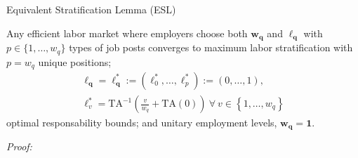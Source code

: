 \documentclass[hidelinks, nonatbib]{elsarticle}
\begin{document}
% 

Equivalent Stratification Lemma (ESL)

Any efficient labor market where employers choose both $\boldsymbol{w_q}$ and $\boldsymbol{\ell_q}$ with $p \in \{1, \dots, w_q\}$ types of job posts converges to maximum labor stratification with
$
p = w_q
$
unique positions;
\begin{gather}
\boldsymbol{\ell_q} = 
\boldsymbol{\ell_{q}^{*}}
:=
(
    \ell_{0}^{*}
    ,
    \dots
    ,
    \ell_{p}^{*}
)
:=
(
    0
    ,
    \dots
    ,
    1
)
,
\\
\ell_{v}^{*}
=
\text{TA}^{-1}\left(
    \frac{v}{w_q}
    +
    \text{TA}(0)
\right)
\
\forall
\
v \in 
\left\{
    1, \dots, w_q
\right\}
\end{gather}
optimal responsability bounds; and unitary employment levels,
$
\boldsymbol{w_q} =
\boldsymbol{1}
.
$

\textit{Proof:}
\end{document}

